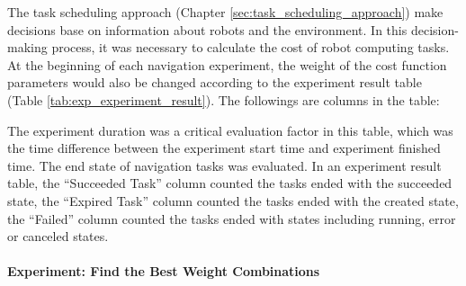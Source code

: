 The task scheduling approach (Chapter \ref{sec:task_scheduling_approach}) make decisions base on information about robots and the environment. In this decision-making process, it was necessary to calculate the cost of robot computing tasks. At the beginning of each navigation experiment, the weight of the cost function parameters would also be changed according to the experiment result table (Table \ref{tab:exp_experiment_result}). The followings are columns in the table:

The experiment duration was a critical evaluation factor in this table, which was the time difference between the experiment start time and experiment finished time. The end state of navigation tasks was evaluated. In an experiment result table, the ``Succeeded Task'' column counted the tasks ended with the succeeded state, the ``Expired Task'' column counted the tasks ended with the created state, the ``Failed'' column counted the tasks ended with states including running, error or canceled states. 

\begin{table}
\centering
{}
\caption{Example result of navigation experiment. The values of the first four columns (weight parameters) were set before the simulation experiment was started, and the values of other columns were filled after the simulation experiment.}
\label{tab:exp_experiment_result}
\end{table}

\paragraph{Experiment: Find the Best Weight Combinations}

